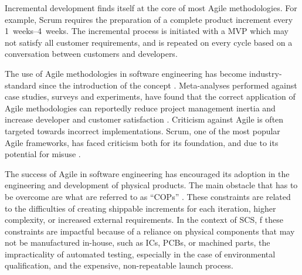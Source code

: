 \documentclass[a4paper,nobib,justified,final]{tufte-book}
\begin{document}
Incremental development finds itself at the core of most Agile methodologies. For example, Scrum \autocite{schwaverDefinitiveGuideScrum2020} requires the preparation of a complete product increment every \qtyrange{1}{4}{weeks}. The incremental process is initiated with a \ac{MVP} which may not satisfy all customer requirements, and is repeated on every cycle based on a conversation between customers and developers.

The use of Agile methodologies in software engineering has become industry-standard since the introduction of the concept \autocite{digital.aiStateAgileReport2025,StatusQuoScaled}. Meta-analyses performed against case studies, surveys and experiments, have found that the correct application of Agile methodologies can reportedly reduce project management inertia and increase developer and customer satisfaction \autocite{leeAgileIntegratedAnalysis2010,dybaEmpiricalStudiesAgile2008}.
Criticism against Agile is often targeted towards incorrect implementations.
Scrum, one of the most popular Agile frameworks, has faced criticism both for its foundation, and due to its potential for misuse \autocite{tsalicoglouHowTransitionAgile2017,bjornDarkAgilePerceiving2019,grayCriticismScrum2015}.

The success of Agile in software engineering has encouraged its adoption in the engineering and development of physical products. The main obstacle that has to be overcome are what are referred to as ``\acp{COP}''  \autocite{schmidtAgileDevelopmentConstraints2017,petersonWhenWorldsCollide2021}.
These constraints are related to the difficulties of creating shippable increments for each iteration, higher complexity, or increased external requirements. In the context of \ac{SCS}, f these constraints are impactful because of a reliance on physical components that may not be manufactured in-house, such as \acsp{IC}, \acsp{PCB}, or machined parts, the impracticality of automated testing, especially in the case of environmental qualification, and the expensive, non-repeatable launch process.
\end{document}

